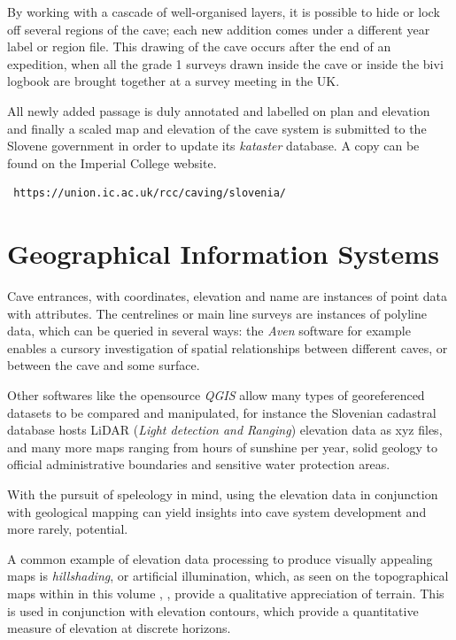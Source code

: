 By working with a cascade of well-organised layers, it is possible to hide or lock off several regions of the cave; each new addition comes under a different year label or region file. This drawing of the cave occurs after the end of an expedition, when all the grade 1 surveys drawn inside the cave or inside the bivi logbook are brought together at a survey meeting in the UK.

All newly added passage is duly annotated and labelled on plan and elevation and finally a scaled map and elevation of the cave system is submitted to the Slovene government in order to update its \emph{kataster} database. A copy can be found on the Imperial College website. \begin{verbatim} https://union.ic.ac.uk/rcc/caving/slovenia/  \end{verbatim}

\section{Geographical Information Systems}

Cave entrances, with coordinates, elevation and name are instances of point data with attributes. The centrelines or main line surveys are instances of polyline data, which can be queried in several ways: the \emph{Aven} software for example enables a cursory investigation of spatial relationships between different caves, or between the cave and some surface.

Other softwares like the opensource \emph{QGIS} allow many types of georeferenced datasets to be compared and manipulated, for instance the Slovenian  cadastral database hosts LiDAR (\emph{Light detection and Ranging}) elevation data as xyz files, and many more maps ranging from hours of sunshine per year, solid geology to official administrative boundaries and sensitive water protection areas. 

With the pursuit of speleology in mind, using the elevation data in conjunction with geological mapping can yield insights into cave system development and more rarely, potential. 

A common example of elevation data processing to produce visually appealing maps is \emph{hillshading}, or artificial illumination, which, as seen on the topographical maps within in this volume , , provide a qualitative appreciation of terrain. This is used in conjunction with elevation contours, which provide a quantitative measure of elevation at discrete horizons. 

